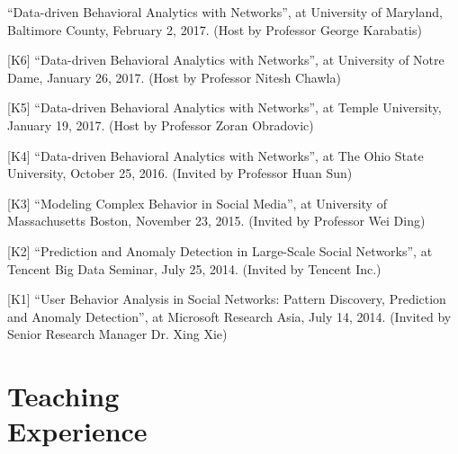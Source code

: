 \documentclass[margin, 9pt]{res}
\begin{document}
\begin{resume}
[K7] ``Data-driven Behavioral Analytics with Networks'', at University of Maryland, Baltimore County, February 2, 2017. (Host by Professor George Karabatis)

[K6] ``Data-driven Behavioral Analytics with Networks'', at University of Notre Dame, January 26, 2017. (Host by Professor Nitesh Chawla)

[K5] ``Data-driven Behavioral Analytics with Networks'', at Temple University, January 19, 2017. (Host by Professor Zoran Obradovic)

[K4] ``Data-driven Behavioral Analytics with Networks'', at The Ohio State University, October 25, 2016. (Invited by Professor Huan Sun)

[K3] ``Modeling Complex Behavior in Social Media'', at University of Massachusetts Boston, November 23, 2015. (Invited by Professor Wei Ding)

[K2] ``Prediction and Anomaly Detection in Large-Scale Social Networks'', at Tencent Big Data Seminar, July 25, 2014. (Invited by Tencent Inc.)

[K1] ``User Behavior Analysis in Social Networks: Pattern Discovery, Prediction and Anomaly Detection'', at Microsoft Research Asia, July 14, 2014. (Invited by Senior Research Manager Dr. Xing Xie)


\section{Teaching \\ Experience}


\end{resume}
\end{document}
